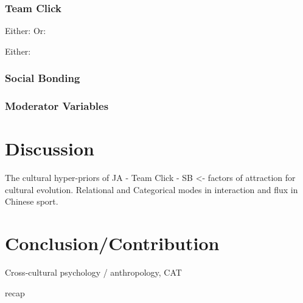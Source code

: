       \subsubsection{Team Click}

Either:
Or:


Either:



  \subsubsection{Social Bonding}






  \subsubsection{Moderator Variables}
























\section{Discussion}



The cultural hyper-priors of JA - Team Click - SB <- factors of attraction for cultural evolution.
Relational and Categorical modes in interaction and flux in Chinese sport.






\section{Conclusion/Contribution}
Cross-cultural psychology / anthropology, CAT

recap
